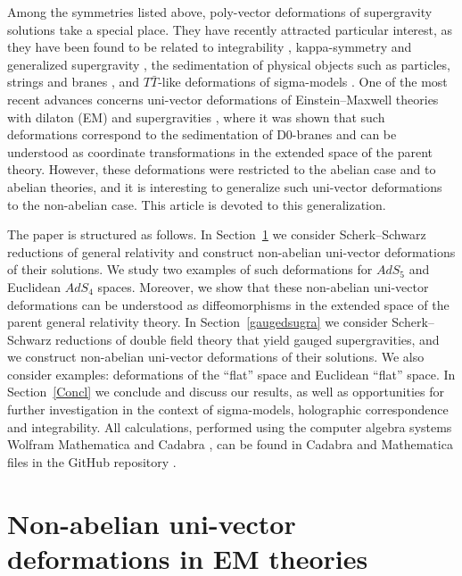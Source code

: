 \documentclass[12pt, utf8]{article}
\numberwithin{equation}{section}
\begin{document}
Among the symmetries listed above, poly-vector deformations of supergravity solutions take a special place. They have recently attracted particular interest, as they have been found to be related to integrability \cite{Gubarev:2023jtp,Musaev:2025zww}, kappa-symmetry and generalized supergravity \cite{Bakhmatov:2022lin,Bakhmatov:2022rjn,Gubarev:2023xaq}, the sedimentation of physical objects such as particles, strings and branes \cite{Barakin:2025jwp,Barakin:2026mxz}, and $T\bar{T}$-like deformations of sigma-models \cite{Barakin:2026rcc}. One of the most recent advances concerns uni-vector deformations of Einstein–Maxwell theories with dilaton (EM) and supergravities \cite{Gubarev:2025hvr,Gubarev:2025qox,Barakin:2026mxz}, where it was shown that such deformations correspond to the sedimentation of D0-branes and can be understood as coordinate transformations in the extended space of the parent theory. However, these deformations were restricted to the abelian case and to abelian theories, and it is interesting to generalize such uni-vector deformations to the non-abelian case. This article is devoted to this generalization.

The paper is structured as follows. In Section~\ref{GTR} we consider Scherk–Schwarz reductions of general relativity and construct non-abelian uni-vector deformations of their solutions. We study two examples of such deformations for $AdS_5$ and Euclidean $AdS_4$ spaces. Moreover, we show that these non-abelian uni-vector deformations can be understood as diffeomorphisms in the extended space of the parent general relativity theory. In Section~\ref{gaugedsugra} we consider Scherk–Schwarz reductions of double field theory that yield gauged supergravities, and we construct non-abelian uni-vector deformations of their solutions. We also consider examples: deformations of the ``flat'' space and Euclidean ``flat'' space. In Section~\ref{Concl} we conclude and discuss our results, as well as opportunities for further investigation in the context of sigma-models, holographic correspondence and integrability. All calculations, performed using the computer algebra systems Wolfram Mathematica and Cadabra \cite{Peeters:2006kp,Peeters:2018dyg}, can be found in Cadabra and Mathematica files in the GitHub repository \cite{Gubarev:2025nonabelianuni}.

\section{Non-abelian uni-vector deformations in EM theories}\label{GTR}
\end{document}
